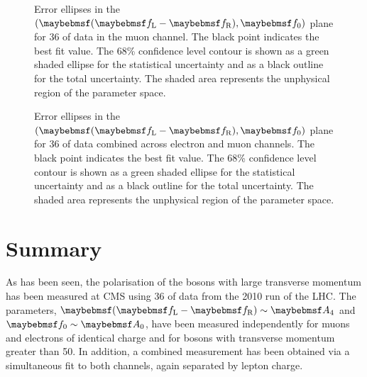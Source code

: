 \begin{figure}
\centering
{}\quad
{}
\caption[Error ellipses in the $(\fLmfR, \f0)$ plane for the muon channel]{Error ellipses in the $(\fLmfR, \f0)$ plane for
  \unit{36}{\invpb} of data in the muon channel. The black point indicates the
  best fit value. The 68\% confidence level contour is shown as a green shaded
  ellipse for the statistical uncertainty and as a black outline for the total
  uncertainty. The shaded area represents the unphysical region of the parameter
  space.}
\label{fig:wpol_contour_mu}
\end{figure}


\begin{figure}
\centering
{}\quad
{}
\caption[Error ellipses in the $(\fLmfR, \f0)$ plane for the combined fit]{Error ellipses in the $(\fLmfR, \f0)$ plane for
  \unit{36}{\invpb} of data combined across electron and muon channels. The
  black point indicates the best fit value. The 68\% confidence level contour is
  shown as a green shaded ellipse for the statistical uncertainty and as a black
  outline for the total uncertainty. The shaded area represents the unphysical
  region of the parameter space.}
\label{fig:wpol_contour_comb}
\end{figure}







\section{Summary}
As has been seen, the polarisation of the \PW bosons with large transverse
momentum has been measured at \ac{CMS} using \unit{36}{\invpb} of data from the
2010 run of the \ac{LHC}. The parameters, $\fLmfR \sim \Afour$ and
$\f0\sim\Azero$, have been measured independently for muons and electrons of
identical charge and for \PW bosons with transverse momentum greater than
\unit{50}{\GeV}. In addition, a combined measurement has been obtained via a
simultaneous fit to both channels, again separated by lepton charge.

